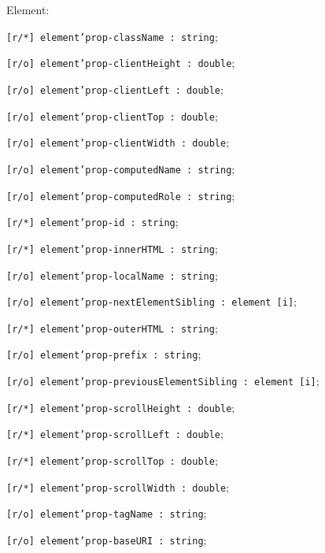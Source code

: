 \begin{icItems}
	\item Element:
	\begin{icItems}
		\item \texttt{[r/*] element'prop-className : string};
		\item \texttt{[r/o] element'prop-clientHeight : double};
		\item \texttt{[r/o] element'prop-clientLeft : double};
		\item \texttt{[r/o] element'prop-clientTop : double};
		\item \texttt{[r/o] element'prop-clientWidth : double};
		\item \texttt{[r/o] element'prop-computedName : string};
		\item \texttt{[r/o] element'prop-computedRole : string};
		\item \texttt{[r/*] element'prop-id : string};
		\item \texttt{[r/*] element'prop-innerHTML : string};
		\item \texttt{[r/o] element'prop-localName : string};
		\item \texttt{[r/o] element'prop-nextElementSibling : element [i]};
		\item \texttt{[r/*] element'prop-outerHTML : string};
		\item \texttt{[r/o] element'prop-prefix : string};
		\item \texttt{[r/o] element'prop-previousElementSibling : element [i]};
		\item \texttt{[r/*] element'prop-scrollHeight : double};
		\item \texttt{[r/*] element'prop-scrollLeft : double};
		\item \texttt{[r/*] element'prop-scrollTop : double};
		\item \texttt{[r/*] element'prop-scrollWidth : double};
		\item \texttt{[r/o] element'prop-tagName : string};
		\item \texttt{[r/o] element'prop-baseURI : string};
	\end{icItems}
	

\end{icItems}
